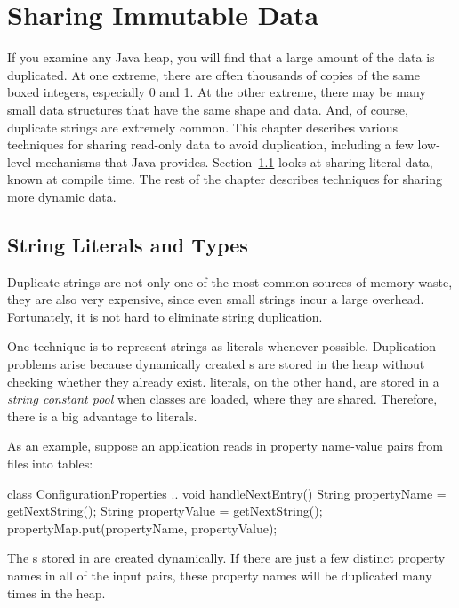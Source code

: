 \chapter{Sharing Immutable Data}
\label{chapter:sharing-immutable-data}

 If you examine any Java
heap, you will find that a
large amount of the data is duplicated. At one extreme, 
there are often thousands of copies of the same boxed
integers, especially 0 and 1. At the other extreme, there may be many
 small data
structures that have the same shape and data. 
And, of course, duplicate strings are extremely common.
This chapter describes various
techniques for sharing read-only data to avoid
duplication, including a few low-level mechanisms that Java provides.
Section~\ref{sec:literals} looks at sharing literal data, known at compile time. 
The rest of the chapter describes techniques for sharing more
dynamic data.

\section{String Literals and  Types}
\label{sec:literals}

Duplicate strings are not only one of the
most common sources of memory waste, they are also very expensive, since even
small strings incur a large overhead. Fortunately, it is not
hard to eliminate string duplication. 

 One technique is to represent strings as  
literals whenever possible. Duplication problems arise because dynamically
 created s
are stored in the heap without checking whether they already
exist.  literals, on the other hand, are stored in a
\emph{string constant pool} when classes
are loaded, where they are shared. Therefore, there is a big advantage to
 literals.

 As an example, suppose an application
reads in property name-value pairs from files into tables:
\begin{shortlisting}
class ConfigurationProperties {
    ..
	void handleNextEntry() {
		String propertyName = getNextString();
		String propertyValue = getNextString();
		propertyMap.put(propertyName, propertyValue);
	}
}
\end{shortlisting}
The s stored in  are created dynamically. If 
there are just a few distinct property names in all of the input pairs, these
property names will be duplicated many times in the heap.

